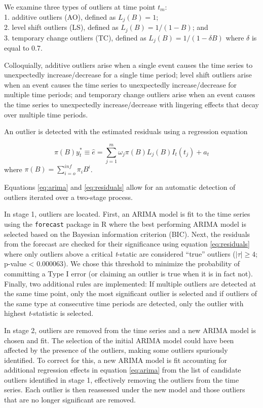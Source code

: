 \documentclass[12pt]{article}
\begin{document}
We examine three types of outliers at time point \(t_m\):\\
1. additive outliers (AO), defined as \(L_j(B)=1\);\\
2. level shift outliers (LS), defined as \(L_j(B) = 1/(1-B)\); and\\
3. temporary change outliers (TC), defined as
\(L_j(B) = 1/(1-\delta B)\) where \(\delta\) is equal to 0.7.

Colloquially, additive outliers arise when a single event causes the
time series to unexpectedly increase/decrease for a single time period;
level shift outliers arise when an event causes the time series to
unexpectedly increase/decrease for multiple time periods; and temporary
change outliers arise when an event causes the time series to
unexpectedly increase/decrease with lingering effects that decay over
multiple time periods.

An outlier is detected with the estimated residuals using a regression
equation

\begin{equation}
\label{eq:residuals}
\pi(B)y_t^* \equiv \hat{e} = \sum_{j=1}^m \omega_j \pi(B)L_j(B)I_t(t_j) + a_t
\end{equation} where \(\pi(B)=\sum_{i=o}^{inf} \pi_iB^i\).

Equations \ref{eq:arima} and \ref{eq:residuals} allow for an automatic
detection of outliers iterated over a two-stage process.

In stage 1, outliers are located. First, an ARIMA model is fit to the
time series using the \texttt{forecast} package in R
\citep{Rforecast, hymdman2008} where the best performing ARIMA model is
selected based on the Bayesian information criterion (BIC). Next, the
residuals from the forecast are checked for their significance using
equation \ref{eq:residuals} where only outliers above a critical
\emph{t}-static are considered ``true'' outliers (\(|\tau| \geq 4\);
p-value \textless{} 0.000063). We chose this threshold to minimize the
probability of committing a Type I error (or claiming an outlier is true
when it is in fact not). Finally, two additional rules are implemented:
If multiple outliers are detected at the same time point, only the most
significant outlier is selected and if outliers of the same type at
consecutive time periods are detected, only the outlier with highest
\emph{t}-statistic is selected.

In stage 2, outliers are removed from the time series and a new ARIMA
model is chosen and fit. The selection of the initial ARIMA model could
have been affected by the presence of the outliers, making some outliers
spuriously identified. To correct for this, a new ARIMA model is fit
accounting for additional regression effects in equation \ref{eq:arima}
from the list of candidate outliers identified in stage 1, effectively
removing the outliers from the time series. Each outlier is then
reassessed under the new model and those outliers that are no longer
significant are removed.
\end{document}
